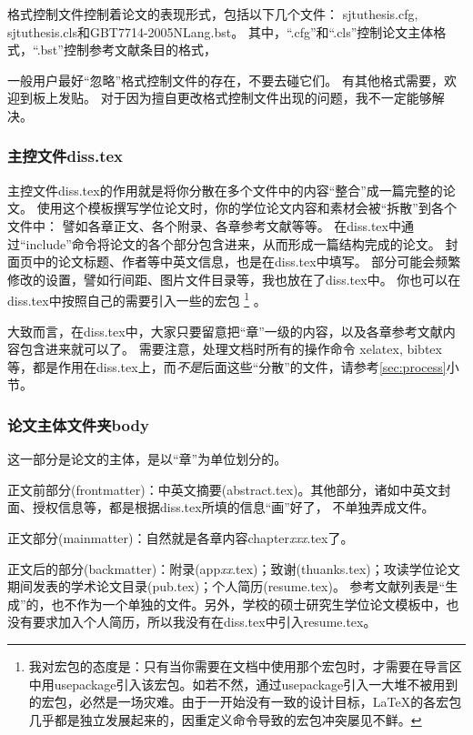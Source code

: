 格式控制文件控制着论文的表现形式，包括以下几个文件：
sjtuthesis.cfg, sjtuthesis.cls和GBT7714-2005NLang.bst。
其中，``.cfg''和``.cls''控制论文主体格式，``.bst''控制参考文献条目的格式，

一般用户最好``忽略''格式控制文件的存在，不要去碰它们。
有其他格式需要，欢迎到板上发贴。
对于因为擅自更改格式控制文件出现的问题，我不一定能够解决。

\subsubsection{主控文件diss.tex}
\label{sec:disstex}

主控文件diss.tex的作用就是将你分散在多个文件中的内容``整合''成一篇完整的论文。
使用这个模板撰写学位论文时，你的学位论文内容和素材会被``拆散''到各个文件中：
譬如各章正文、各个附录、各章参考文献等等。
在diss.tex中通过``include''命令将论文的各个部分包含进来，从而形成一篇结构完成的论文。
封面页中的论文标题、作者等中英文信息，也是在diss.tex中填写。
部分可能会频繁修改的设置，譬如行间距、图片文件目录等，我也放在了diss.tex中。
你也可以在diss.tex中按照自己的需要引入一些的宏包
\footnote{我对宏包的态度是：只有当你需要在文档中使用那个宏包时，才需要在导言区中用usepackage引入该宏包。如若不然，通过usepackage引入一大堆不被用到的宏包，必然是一场灾难。由于一开始没有一致的设计目标，\LaTeX 的各宏包几乎都是独立发展起来的，因重定义命令导致的宏包冲突屡见不鲜。}
。

大致而言，在diss.tex中，大家只要留意把``章''一级的内容，以及各章参考文献内容包含进来就可以了。
需要注意，处理文档时所有的操作命令 \cndash{} xelatex, bibtex等，都是作用在diss.tex上，而\emph{不是}后面这些``分散''的文件，请参考\ref{sec:process}小节。

\subsubsection{论文主体文件夹body}
\label{sec:thesisbody}

这一部分是论文的主体，是以``章''为单位划分的。

正文前部分(frontmatter)：中英文摘要(abstract.tex)。其他部分，诸如中英文封面、授权信息等，都是根据diss.tex所填的信息``画''好了，
不单独弄成文件。

正文部分(mainmatter)：自然就是各章内容chapter\emph{xxx}.tex了。

正文后的部分(backmatter)：附录(app\emph{xx}.tex)；致谢(thuanks.tex)；攻读学位论文期间发表的学术论文目录(pub.tex)；个人简历(resume.tex)。
参考文献列表是``生成''的，也不作为一个单独的文件。另外，学校的硕士研究生学位论文模板中，也没有要求加入个人简历，所以我没有在diss.tex中引入resume.tex。

